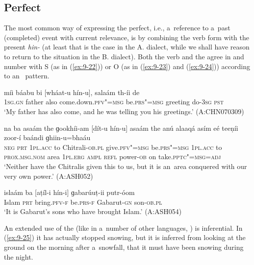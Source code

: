 \subsection{Perfect}
\label{subsec:9-1-7}

The most common way of expressing the perfect, i.e., a~reference to a~past (completed) event with current relevance, is by combining the  verb form with the present   \textit{hin-} (at least that is the case in the A. dialect, while we shall have reason to return to the situation in the B. dialect). Both the  verb and the  agree in  and number with S (as in (\ref{ex:9-22})) or O (as in (\ref{ex:9-23}) and (\ref{ex:9-24})) according to an~ pattern.

\begin{exe}
\ex
\label{ex:9-22}
\gll míi báabu bi [wháat-u hín-u], salaám th-íi de \\
\textsc{1sg.gn} father also come.down.\textsc{pfv"=msg} be.\textsc{prs"=msg} greeting do-\textsc{3sg} \textsc{pst} \\
\glt `My father has also come, and he was telling you his greetings.' (A:CHN070309)

\ex
\label{ex:9-23}
\gll na ba asaám the ɡookhíi-am [dít-u hín-u] asaám the anú alaaqá asím eé teeṇíi zoor-í baándi ɡhiin-u=bhaáu \\
\textsc{neg} \textsc{prt} \textsc{1pl.acc} to Chitrali-\textsc{ob.pl} give.\textsc{pfv"=msg}  be.\textsc{prs"=msg } \textsc{1pl.acc} to \textsc{prox.msg.nom} area  \textsc{1pl.erg} \textsc{ampl} \textsc{refl} power-\textsc{ob} on take.\textsc{pptc"=msg=adj} \\
\glt `Neither have the Chitralis given this to us, but it is an~area conquered with our very own power.' (A:ASH052)

\ex
\label{ex:9-24}
\gll islaám ba [aṭíl-i hín-i] ɡabarúuṭ-ii putr-óom \\
Islam \textsc{prt} bring.\textsc{pfv-f} be.\textsc{prs-f} Gabarut-\textsc{gn} son-\textsc{ob.pl} \\
\glt `It is Gabarut's sons who have brought Islam.' (A:ASH054) 
\end{exe}

An extended use of the  (like in a~number of other languages, \citealt[152]{dahl1985}) is inferential. In (\ref{ex:9-25}) it has actually stopped snowing, but it is inferred from looking at the ground on the morning after a~snowfall, that it must have been snowing during the night.

